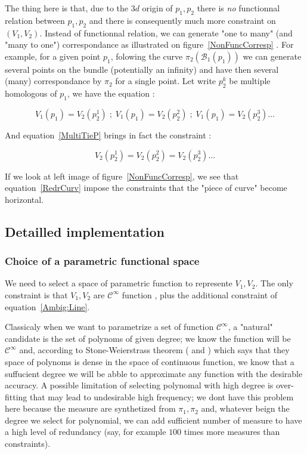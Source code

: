 \documentclass{ipol}
\newcommand{\Bund}[1]{\ensuremath{\mathcal{B}_{#1}}}
\newcommand{\BundO}{\Bund{1}}
\begin{document}
The thing here is that, due to the $3d$ origin of $p_1,p_2$ there is
\emph{no} functionnal relation between $p_1,p_2$ and there is consequently
much more constraint on $(V_1,V_2)$. Instead of functionnal relation,
we can generate  "one to many" (and  "many to one") correspondance as illustrated on figure~\ref{NonFuncCorresp} .
For example, for a given  point $p_1$, folowing the curve $\pi_2(\BundO(p_1))$ we can generate
several points on the bundle (potentially an infinity) and have then several (many) correspondance
by  $\pi_2$ for a single point. Let write $p^k_2$ be multiple homologous of $p_1$,
we have the equation  :


\begin{equation}
    V_1(p_1) = V_2(p^1_2)   \;;\; V_1(p_1) = V_2(p^2_2)   \;;\; V_1(p_1) = V_2(p^3_2)  \dots \label{MultiTieP}
\end{equation}


And equation~\ref{MultiTieP} brings in fact the constraint : 

\begin{equation}
V_2(p^1_2) = V_2(p^2_2)  =  V_2(p^3_2) \dots \label{RedrCurv}
\end{equation}

If we look at left image of figure~\ref{NonFuncCorresp}, we see that equation~\ref{RedrCurv}
impose the constraints that the "piece of curve" become horizontal.






\subsection{Detailled implementation}


\subsubsection{Choice of a parametric functional space}
\label{ChoicePolyn}

We need to select a space of parametric function to represente $V_1,V_2$. The only constraint
is that $V_1,V_2$ are $\mathcal{C}^{\infty}$ function , plus the additional constraint of 
equation~\ref{Ambig:Line}. 

Classicaly when we want to parametrize a set of function  $\mathcal{C}^{\infty}$,
a "natural" candidate is the set of polynoms of given degree; we know the function will be
$\mathcal{C}^{\infty}$ and, according to Stone-Weierstrass theorem (\cite{Weierstrass1885} and \cite{Stone1937})
which says that they space of polynoms is dense in the space of continuous function, we know that a suffucient
degree we will be abble to approximate any function with the desirable accuracy. A possible
limitation of selecting polynomal with high degree is over-fitting that may lead to
undesirable high frequency; we dont have this problem here because  the measure
are synthetized from $\pi_1,\pi_2$ and, whatever beign the degree we select for polynomial,
we can add sufficient number of measure to have a high level of redundancy (say, for example
$100$ times more measures than constraints).
\end{document}
